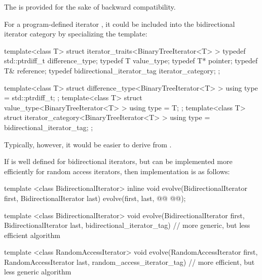 \begin{addedblock}
\pnum
\enternote
The  is provided for the sake of backward compatibility.
\exitnote
\end{addedblock}

\pnum
{}%
%
%
%
%
%
%
\enterexample
For a program-defined iterator
,
it could be included
into the bidirectional iterator category by specializing the
\added{, }
 template:

\begin{removedblock}
\begin{codeblock}
template<class T> struct iterator_traits<BinaryTreeIterator<T> > {
  typedef std::ptrdiff_t difference_type;
  typedef T value_type;
  typedef T* pointer;
  typedef T& reference;
  typedef bidirectional_iterator_tag iterator_category;
};
\end{codeblock}
\end{removedblock}
\begin{addedblock}
\begin{codeblock}
template<class T> struct difference_type<BinaryTreeIterator<T> > {
  using type = std::ptrdiff_t;
};
template<class T> struct value_type<BinaryTreeIterator<T> > {
  using type = T;
};
template<class T> struct iterator_category<BinaryTreeIterator<T> > {
  using type = bidirectional_iterator_tag;
};
\end{codeblock}
\end{addedblock}

Typically, however, it would be easier to derive
from
.
\exitexample

\pnum
\enterexample
If
is well defined for bidirectional iterators, but can be implemented more
efficiently for random access iterators, then  implementation is as
follows:

\begin{codeblock}
template <class BidirectionalIterator>
inline void
evolve(BidirectionalIterator first, BidirectionalIterator last) {
  evolve(first, last,
    @@
    @@);
}

template <class BidirectionalIterator>
void evolve(BidirectionalIterator first, BidirectionalIterator last,
  bidirectional_iterator_tag) {
  // more generic, but less efficient algorithm
}

template <class RandomAccessIterator>
void evolve(RandomAccessIterator first, RandomAccessIterator last,
  random_access_iterator_tag) {
  // more efficient, but less generic algorithm
}
\end{codeblock}
\exitexample

